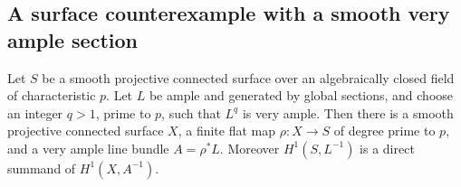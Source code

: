 \subsection{A surface counterexample with a smooth very ample section}

\begin{lemma}
\label{lem:OC-Kummer-very-ample}
Let $S$ be a smooth projective connected surface over an algebraically closed field of characteristic $p$.  Let $L$ be ample and generated by global sections, and choose an integer $q>1$, prime to $p$, such that $L^q$ is very ample.  Then there is a smooth projective connected surface $X$, a finite flat map $\rho:X\to S$ of degree prime to $p$, and a very ample line bundle $A=\rho^*L$.  Moreover $H^1(S,L^{-1})$ is a direct summand of $H^1(X,A^{-1})$.
\end{lemma}
